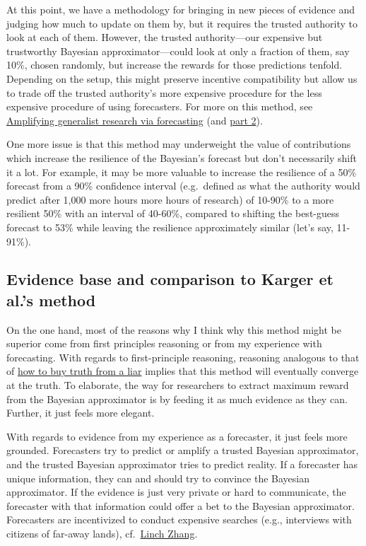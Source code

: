 \documentclass[]{article}
\begin{document}
At this point, we have a methodology for bringing in new pieces of
evidence and judging how much to update on them by, but it requires the
trusted authority to look at each of them. However, the trusted
authority---our expensive but trustworthy Bayesian approximator---could
look at only a fraction of them, say 10\%, chosen randomly, but increase
the rewards for those predictions tenfold. Depending on the setup, this
might preserve incentive compatibility but allow us to trade off the
trusted authority's more expensive procedure for the less expensive
procedure of using forecasters. For more on this method, see
\href{https://www.lesswrong.com/posts/cLtdcxu9E4noRSons/part-1-amplifying-generalist-research-via-forecasting}{Amplifying
generalist research via forecasting} (and
\href{https://www.lesswrong.com/posts/FeE9nR7RPZrLtsYzD/part-2-amplifying-generalist-research-via-forecasting}{part
2}).

One more issue is that this method may underweight the value of
contributions which increase the resilience of the Bayesian's forecast
but don't necessarily shift it a lot. For example, it may be more
valuable to increase the resilience of a 50\% forecast from a 90\%
confidence interval (e.g.~defined as what the authority would predict
after 1,000 more hours more hours of research) of 10-90\% to a more
resilient 50\% with an interval of 40-60\%, compared to shifting the
best-guess forecast to 53\% while leaving the resilience approximately
similar (let's say, 11-91\%).

\hypertarget{evidence-base-and-comparison-to-karger-et-al.s-method}{%
\subsection{Evidence base and comparison to Karger et al.'s
method}\label{evidence-base-and-comparison-to-karger-et-al.s-method}}

On the one hand, most of the reasons why I think why this method might
be superior come from first principles reasoning or from my experience
with forecasting. With regards to first-principle reasoning, reasoning
analogous to that of
\href{https://meteuphoric.com/2014/07/21/how-to-buy-a-truth-from-a-liar/}{how
to buy truth from a liar} implies that this method will eventually
converge at the truth. To elaborate, the way for researchers to extract
maximum reward from the Bayesian approximator is by feeding it as much
evidence as they can. Further, it just feels more elegant.

With regards to evidence from my experience as a forecaster, it just
feels more grounded. Forecasters try to predict or amplify a trusted
Bayesian approximator, and the trusted Bayesian approximator tries to
predict reality. If a forecaster has unique information, they can and
should try to convince the Bayesian approximator. If the evidence is
just very private or hard to communicate, the forecaster with that
information could offer a bet to the Bayesian approximator. Forecasters
are incentivized to conduct expensive searches (e.g., interviews with
citizens of far-away lands),
cf.~\href{https://twitter.com/LinchZhang/status/1455759586158268417}{Linch
Zhang}.
\end{document}

